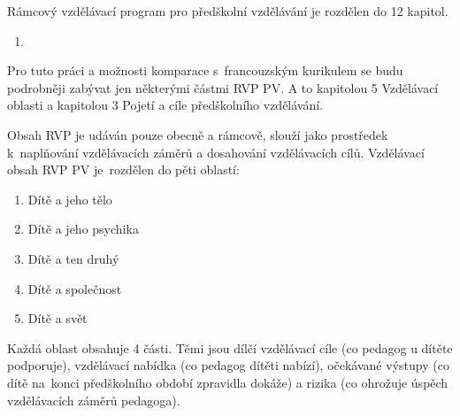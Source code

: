 		Rámcový vzdělávací program pro předškolní vzdělávání je rozdělen do 12 kapitol.
		\begin{enumerate}[1.]
			\setlength\itemsep{-2mm}

			\item \textit{} \citep[s.~2]{RVP}
		\end{enumerate}

		Pro tuto práci a možnosti komparace s francouzským kurikulem se budu podrobněji zabývat jen některými částmi RVP PV. A to kapitolou 5 Vzdělávací oblasti a kapitolou 3 Pojetí a cíle předškolního vzdělávání.

		Obsah RVP je udáván pouze obecně a rámcově, slouží jako prostředek k naplňování
		vzdělávacích záměrů a dosahování vzdělávacích cílů. Vzdělávací obsah RVP PV je rozdělen do pěti oblastí:

		\begin{enumerate}[1.]
			\setlength\itemsep{-2mm}
			\item Dítě a jeho tělo
			\item Dítě a jeho psychika
			\item Dítě a ten druhý
			\item Dítě a společnost
			\item Dítě a svět
		\end{enumerate}

		Každá oblast obsahuje 4 části. Těmi jsou dílčí vzdělávací cíle (co pedagog u dítěte podporuje), vzdělávací nabídka (co pedagog dítěti nabízí), očekávané výstupy (co dítě na konci předškolního období zpravidla dokáže) a rizika (co ohrožuje úspěch vzdělávacích záměrů pedagoga).

